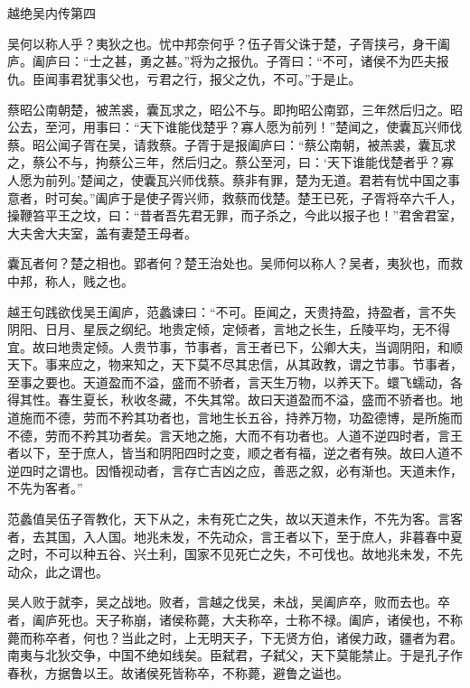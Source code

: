 \documentclass[12pt,UTF8]{ctexbook}
\begin{document}
\part{}

越绝吴内传第四

吴何以称人乎？夷狄之也。忧中邦奈何乎？伍子胥父诛于楚，子胥挟弓，身干阖庐。阖庐曰：“士之甚，勇之甚。”将为之报仇。子胥曰：“不可，诸侯不为匹夫报仇。臣闻事君犹事父也，亏君之行，报父之仇，不可。”于是止。

蔡昭公南朝楚，被羔裘，囊瓦求之，昭公不与。即拘昭公南郢，三年然后归之。昭公去，至河，用事曰：“天下谁能伐楚乎？寡人愿为前列！”楚闻之，使囊瓦兴师伐蔡。昭公闻子胥在吴，请救蔡。子胥于是报阖庐曰：“蔡公南朝，被羔裘，囊瓦求之，蔡公不与，拘蔡公三年，然后归之。蔡公至河，曰：‘天下谁能伐楚者乎？寡人愿为前列。’楚闻之，使囊瓦兴师伐蔡。蔡非有罪，楚为无道。君若有忧中国之事意者，时可矣。”阖庐于是使子胥兴师，救蔡而伐楚。楚王已死，子胥将卒六千人，操鞭笞平王之坟，曰：“昔者吾先君无罪，而子杀之，今此以报子也！”君舍君室，大夫舍大夫室，盖有妻楚王母者。

囊瓦者何？楚之相也。郢者何？楚王治处也。吴师何以称人？吴者，夷狄也，而救中邦，称人，贱之也。

越王句践欲伐吴王阖庐，范蠡谏曰：“不可。臣闻之，天贵持盈，持盈者，言不失阴阳、日月、星辰之纲纪。地贵定倾，定倾者，言地之长生，丘陵平均，无不得宜。故曰地贵定倾。人贵节事，节事者，言王者已下，公卿大夫，当调阴阳，和顺天下。事来应之，物来知之，天下莫不尽其忠信，从其政教，谓之节事。节事者，至事之要也。天道盈而不溢，盛而不骄者，言天生万物，以养天下。蠉飞蠕动，各得其性。春生夏长，秋收冬藏，不失其常。故曰天道盈而不溢，盛而不骄者也。地道施而不德，劳而不矜其功者也，言地生长五谷，持养万物，功盈德博，是所施而不德，劳而不矜其功者矣。言天地之施，大而不有功者也。人道不逆四时者，言王者以下，至于庶人，皆当和阴阳四时之变，顺之者有福，逆之者有殃。故曰人道不逆四时之谓也。因惛视动者，言存亡吉凶之应，善恶之叙，必有渐也。天道未作，不先为客者。”

范蠡值吴伍子胥教化，天下从之，未有死亡之失，故以天道未作，不先为客。言客者，去其国，入人国。地兆未发，不先动众，言王者以下，至于庶人，非暮春中夏之时，不可以种五谷、兴土利，国家不见死亡之失，不可伐也。故地兆未发，不先动众，此之谓也。

吴人败于就李，吴之战地。败者，言越之伐吴，未战，吴阖庐卒，败而去也。卒者，阖庐死也。天子称崩，诸侯称薨，大夫称卒，士称不禄。阖庐，诸侯也，不称薨而称卒者，何也？当此之时，上无明天子，下无贤方伯，诸侯力政，疆者为君。南夷与北狄交争，中国不绝如线矣。臣弑君，子弑父，天下莫能禁止。于是孔子作春秋，方据鲁以王。故诸侯死皆称卒，不称薨，避鲁之谥也。
\end{document}
